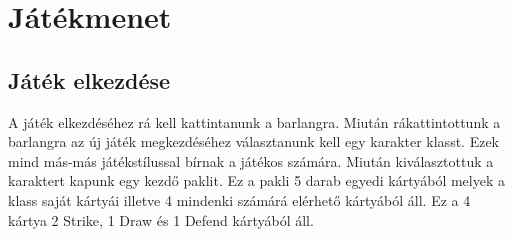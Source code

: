 \chapter{Játékmenet}

\section{Játék elkezdése}
A játék elkezdéséhez rá kell kattintanunk a barlangra. Miután rákattintottunk a barlangra az új játék megkezdéséhez választanunk kell egy karakter klasst. Ezek mind más-más játékstílussal bírnak a játékos számára. Miután kiválasztottuk a karaktert kapunk egy kezdő paklit. Ez a pakli 5 darab egyedi kártyából melyek a klass saját kártyái illetve 4 mindenki számárá elérhető kártyából áll. Ez a 4 kártya 2 Strike, 1 Draw és 1 Defend kártyából áll.

